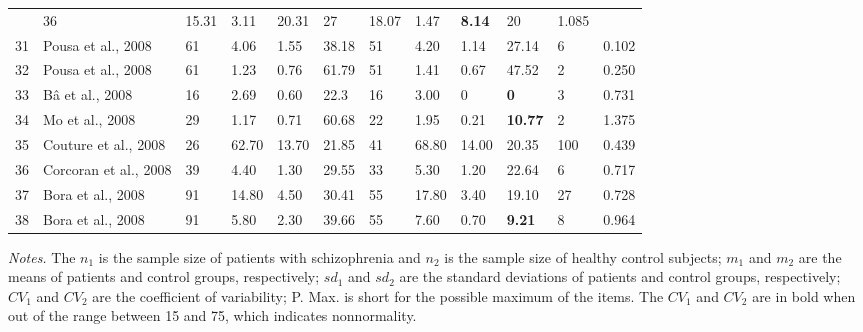 \documentclass[a4paper, 12pt, twoside]{article}
\begin{document}
\begin{landscape}
\begin{longtable}[l]{cL{4cm} R{1.5cm}  R{1.5cm} R{1.5cm}R{1.5cm}  R{1.5cm}  R{1.5cm} R{1.5cm}R{1.5cm} R{1.5cm}R{1.5cm}}
		& 36 & 15.31 & 3.11 & 20.31 & 27 & 18.07 & 1.47 & \textbf{8.14} & 20 & 1.085\\  
		31 & Pousa et al., 2008 
		& 61 & 4.06 & 1.55 & 38.18 & 51 & 4.20 & 1.14 & 27.14 & 6 & 0.102 \\       
		32 & Pousa et al., 2008 
		& 61 & 1.23 & 0.76 & 61.79 & 51 & 1.41 & 0.67 & 47.52 & 2  & 0.250\\       
		33 & B{\^a} et al., 2008 
		& 16 & 2.69 & 0.60 & 22.3 & 16 & 3.00 & 0 & \textbf{0} & 3 &0.731\\           
		34 & Mo et al., 2008 
		& 29 & 1.17 & 0.71 & 60.68 & 22 & 1.95 & 0.21 & \textbf{10.77} & 2 & 1.375 \\           
		35 & Couture et al., 2008 
		& 26 & 62.70 & 13.70 & 21.85 & 41 & 68.80 & 14.00 & 20.35 & 100 & 0.439\\         
		36 & Corcoran et al., 2008 
		& 39 & 4.40 & 1.30 & 29.55 & 33 & 5.30 & 1.20 & 22.64 & 6 & 0.717\\
		37 & Bora et al., 2008 
		& 91 & 14.80 & 4.50 & 30.41 & 55 & 17.80 & 3.40 & 19.10 & 27 & 0.728\\         
		38 & Bora et al., 2008 
		& 91 & 5.80 & 2.30 & 39.66 & 55 & 7.60 & 0.70 & \textbf{9.21} & 8 & 0.964\\ 
	\end{longtable}
	\begin{tablenotes}
		\item \textit{Notes.} The $n_1$ is the sample size of patients with schizophrenia and $n_2$ is the sample size of healthy control subjects; $m_1$ and $m_2$ are the means of patients and control groups, respectively; $sd_1$ and $sd_2$ are the standard deviations of patients and control groups, respectively; $CV_1$ and $CV_2$ are the coefficient of variability; P. Max. is short for the possible maximum of the items. The $CV_1$ and $CV_2$ are in bold when out of the range between 15 and 75, which indicates nonnormality. 
	\end{tablenotes}
\end{landscape}
\end{document}
